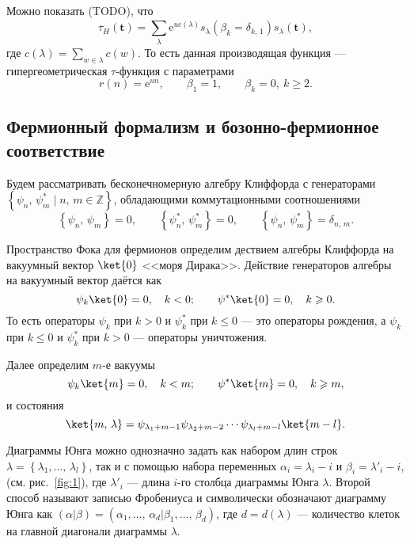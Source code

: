 \documentclass[a5paper,twoside]{article}
\begin{document}
Можно показать (TODO), что
\begin{equation}
	\tau_H(\mathbf{t})=\sum_{\lambda}^{} \mathrm{e}^{u c(\lambda)}s_\lambda \left( \beta_k=\delta_{k,\,1} \right) 
	s_\lambda(\mathbf{t})
\label{eq:4}
,\end{equation} 
где $c(\lambda)= \sum_{w \in \lambda}^{} c(w)$. 
То есть данная производящая функция --- гипергеометрическая
$\tau$-функция с параметрами
\begin{equation}
	r(n)=\mathrm{e} ^{un},\qquad
	\beta_1=1,\qquad \beta_k=0,\ k\ge 2
.\end{equation} 
\subsection{Фермионный формализм и бозонно-фермионное соответствие}
Будем рассматривать бесконечномерную алгебру Клиффорда
с генераторами $\left\{ \psi_n,\,\psi^*_m \mid n,\,m \in \mathbb{Z} \right\} $, обладающими коммутационными соотношениями
\begin{equation}
\left\{ \psi_n,\,\psi_m \right\} =0,\qquad
\left\{ \psi_n^*,\,\psi^*_{m} \right\}=0,\qquad
\left\{ \psi_n,\,\psi_{m}^* \right\}=\delta_{n,\,m}
.\end{equation} 

Пространство Фока для фермионов определим дествием
алгебры Клиффорда на вакуумный вектор $\ket{0}$ <<моря Дирака>>. Действие генераторов алгебры на вакуумный вектор
даётся как
\begin{equation}
\psi_k\ket{0}=0,\quad k< 0;\qquad\psi^* \ket{0}=0,\quad
k\ge  0
.\end{equation} 
То есть операторы $\psi_k$ при $k>0$ и $\psi^*_k$ при
$k\le 0$ --- это операторы рождения, а $\psi_k$ при $k\le 0$ 
и $\psi_k^*$ при  $k> 0$ --- операторы уничтожения.

Далее определим $m$-е вакуумы
\begin{equation}
\psi_k\ket{m}=0,\quad k< m;\qquad\psi^* \ket{m}=0,\quad
k\ge  m
,\end{equation}
и состояния
\begin{equation}
	\ket{m,\,\lambda}= \psi_{\lambda_1+m-1}\psi_{\lambda_2+m-2}\cdots\psi_{\lambda_{l}+m-l}\ket{m-l}
.\end{equation} 

Диаграммы Юнга можно однозначно задать как набором длин строк $\lambda=\left\{ \lambda_1,\ldots,\, \lambda_{l} \right\} $, так и с помощью набора переменных
$\alpha_i=\lambda_i-i$ и $\beta_i=\lambda'_i-i$, (см. рис.~\ref{fig:1}), где $\lambda'_i$ --- длина $i$-го столбца
диаграммы Юнга $\lambda$.
Второй способ называют записью Фробениуса и символически
обозначают диаграмму Юнга как $\left( \alpha| \beta \right) =\left( \alpha_1,\ldots,\,\alpha_d|\beta_1,\ldots,\,\beta_d \right) $, где $d=d(\lambda)$ --- количество клеток на главной диагонали диаграммы $\lambda$.
\end{document}
